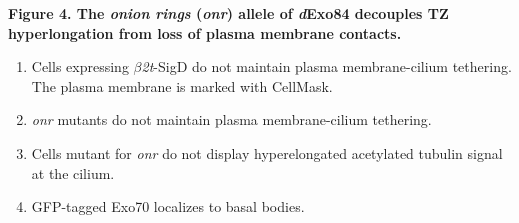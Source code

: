 \documentclass[12pt, twoside, letterpaper]{article}
\newcommand{\sigd}{$\beta$\textit{2t}-SigD}
\begin{document}
\begin{doublespacing}
\begin{linenumbers}
    \textbf{Figure 4. The \textit{onion rings} (\textit{onr}) allele of \textit{d}Exo84 decouples TZ hyperlongation from loss of plasma membrane contacts.}
    \begin{enumerate}[label={(\Alph*)}, nolistsep]
    \item Cells expressing \sigd{} do not maintain plasma membrane-cilium tethering. The plasma membrane is marked with CellMask.
    \item \textit{onr} mutants do not maintain plasma membrane-cilium tethering.
    \item Cells mutant for \textit{onr} do not display hyperelongated acetylated tubulin signal at the cilium.
    \item GFP-tagged Exo70 localizes to basal bodies.
    \end{enumerate}
    
  \end{linenumbers}
\end{doublespacing}


\end{document}
